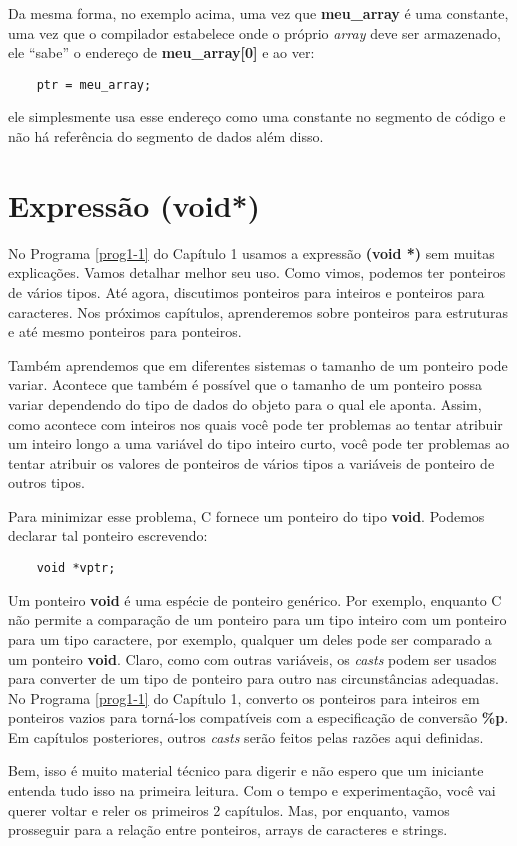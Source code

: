 Da mesma forma, no exemplo acima, uma vez que \textbf{meu\_array} é uma constante, uma vez que o compilador estabelece onde o próprio \textit{array} deve ser armazenado, ele ``sabe'' o endereço de \textbf{meu\_array[0]} e ao ver:
\begin{lstlisting}
	ptr = meu_array;
\end{lstlisting}
ele simplesmente usa esse endereço como uma constante no segmento de código e não há referência do segmento de dados além disso.

\section{Expressão (void*)}
\label{expvoid}

No Programa \ref{prog1-1} do Capítulo 1 usamos a expressão \textbf{(void *)} sem muitas explicações. Vamos detalhar melhor seu uso. Como vimos, podemos ter ponteiros de vários tipos. Até agora, discutimos ponteiros para inteiros e ponteiros para caracteres. Nos próximos capítulos, aprenderemos sobre ponteiros para estruturas e até mesmo ponteiros para ponteiros.

Também aprendemos que em diferentes sistemas o tamanho de um ponteiro pode variar. Acontece que também é possível que o tamanho de um ponteiro possa variar dependendo do tipo de dados do objeto para o qual ele aponta. Assim, como acontece com inteiros nos quais você pode ter problemas ao tentar atribuir um inteiro longo a uma variável do tipo inteiro curto, você pode ter problemas ao tentar atribuir os valores de ponteiros de vários tipos a variáveis de ponteiro de outros tipos.

Para minimizar esse problema, C fornece um ponteiro do tipo \textbf{void}. Podemos declarar tal ponteiro escrevendo:
\begin{lstlisting}
	void *vptr;
\end{lstlisting}

Um ponteiro \textbf{void} é uma espécie de ponteiro genérico. Por exemplo, enquanto C não permite a comparação de um ponteiro para um tipo inteiro com um ponteiro para um tipo caractere, por exemplo, qualquer um deles pode ser comparado a um ponteiro \textbf{void}. Claro, como com outras variáveis, os \textit{casts} podem ser usados para converter de um tipo de ponteiro para outro nas circunstâncias adequadas. No Programa \ref{prog1-1} do Capítulo 1, converto os ponteiros para inteiros em ponteiros vazios para torná-los compatíveis com a especificação de conversão \textbf{\%p}. Em capítulos posteriores, outros \textit{casts} serão feitos pelas razões aqui definidas.

Bem, isso é muito material técnico para digerir e não espero que um iniciante entenda tudo isso na primeira leitura. Com o tempo e experimentação, você vai querer voltar e reler os primeiros 2 capítulos. Mas, por enquanto, vamos prosseguir para a relação entre ponteiros, arrays de caracteres e strings.

